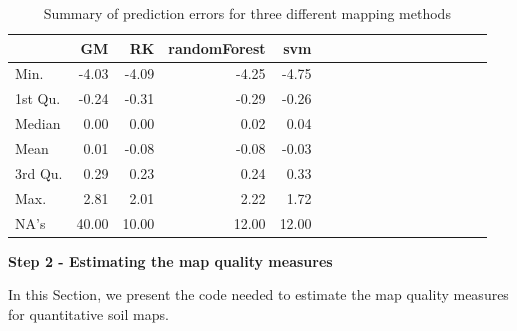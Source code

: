 \documentclass[10pt,b5paper,]{book}
\theoremstyle{definition}
\theoremstyle{definition}
\theoremstyle{definition}
\theoremstyle{remark}
\begin{document}
\begin{table}

\caption{\label{tab:prederrors}Summary of prediction errors for three different mapping methods}
\centering
\begin{tabular}[t]{lrrrrrrrrrrrrrrrr}
\toprule
  & GM & RK & randomForest & svm\\
\midrule
Min. & -4.03 & -4.09 & -4.25 & -4.75\\
1st Qu. & -0.24 & -0.31 & -0.29 & -0.26\\
Median & 0.00 & 0.00 & 0.02 & 0.04\\
Mean & 0.01 & -0.08 & -0.08 & -0.03\\
3rd Qu. & 0.29 & 0.23 & 0.24 & 0.33\\
\addlinespace
Max. & 2.81 & 2.01 & 2.22 & 1.72\\
NA's & 40.00 & 10.00 & 12.00 & 12.00\\
\bottomrule
\end{tabular}
\end{table}

\textbf{Step 2 - Estimating the map quality measures}

In this Section, we present the code needed to estimate the map quality
measures for quantitative soil maps.
\end{document}
